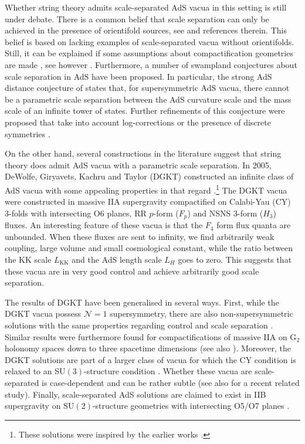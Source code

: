 \documentclass[11pt]{article}
\renewcommand{\[}{\left[}
\renewcommand{\]}{\right]}
\renewcommand{\(}{\left(}
\renewcommand{\)}{\right)}
\newcommand{\<}{\langle}
\renewcommand{\>}{\rangle}
\begin{document}
Whether string theory admits scale-separated AdS vacua in this setting is still under debate. 
There is a common belief that scale separation can only be achieved in the presence of orientifold sources, see \cite{Tsimpis:2012tu, Gautason:2015tig, Lust:2020npd, DeLuca:2021mcj} and references therein. This belief is based on lacking examples of scale-separated vacua without orientifolds.  Still, it can be explained if some assumptions about compactification geometries are made \cite{Gautason:2015tig}, see however \cite{DeLuca:2021mcj}. Furthermore, a number of swampland conjectures about scale separation in AdS have been proposed. In particular, the strong AdS distance conjecture of \cite{Lust:2019zwm} states that, for supersymmetric AdS vacua, there cannot be a parametric scale separation between the AdS curvature scale and the mass scale of an infinite tower of states. Further refinements of this conjecture were proposed that take into account log-corrections \cite{Blumenhagen:2019vgj} or the presence of discrete symmetries \cite{Buratti:2020kda}.

On the other hand, several constructions in the literature suggest that string theory does admit AdS vacua with a parametric scale separation. In 2005, DeWolfe, Giryavets, Kachru and Taylor (DGKT) constructed an infinite class of AdS vacua with some appealing properties in that regard \cite{DeWolfe:2005uu}.\footnote{These solutions were inspired by the earlier works \cite{Derendinger:2004jn, Behrndt:2004mj}.} The DGKT vacua were constructed in massive IIA supergravity compactified on Calabi-Yau (CY) 3-folds with intersecting O6 planes, RR $p$-form ($F_p$) and NSNS 3-form ($H_3$) fluxes. An interesting feature of these vacua is that the $F_4$ form flux quanta are unbounded. When these fluxes are sent to infinity, we find arbitrarily weak coupling, large volume and small cosmological constant, while the ratio between the KK scale $L_\text{KK}$ and the AdS length scale $L_H$ goes to zero. This suggests that these vacua are in very good control and achieve arbitrarily good scale separation.

The results of DGKT have been generalised in several ways. First, while the DGKT vacua possess $\mathcal{N}=1$ supersymmetry, there are also non-supersymmetric solutions with the same properties regarding control and scale separation \cite{Camara:2005dc, Narayan:2010em, Marchesano:2019hfb}. Similar results were furthermore found for compactifications of massive IIA on G$_2$ holonomy spaces down to three spacetime dimensions \cite{Farakos:2020phe} (see also \cite{Emelin:2021gzx}). 
Moreover, the DGKT solutions are part of a larger class of vacua for which the CY condition is relaxed to an SU$(3)$-structure condition \cite{Caviezel:2008ik}. Whether these vacua are scale-separated is case-dependent and can be rather subtle \cite{Font:2019uva} (see also \cite{Ishiguro:2021csu} for a recent related study). Finally, scale-separated AdS solutions are claimed to exist in IIB supergravity on SU$(2)$-structure geometries with intersecting O5/O7 planes \cite{Caviezel:2009tu, Petrini:2013ika}.
\end{document}
